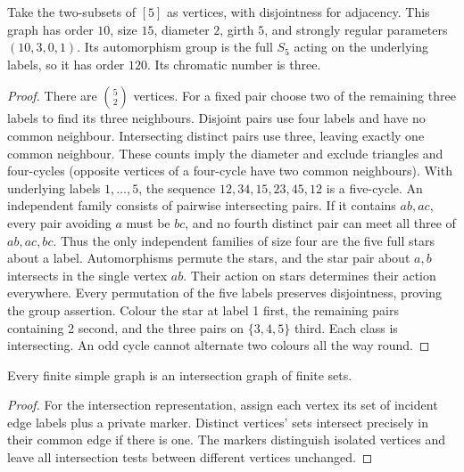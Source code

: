 \begin{theorem}\leavevmode\label{thm:petersen}
Take the two-subsets of $[5]$ as vertices, with disjointness for adjacency.
This graph has order $10$, size $15$, diameter $2$, girth $5$, and strongly
regular parameters $(10,3,0,1)$. Its automorphism group is the full $S_5$
acting on the underlying labels, so it has order $120$. Its chromatic number
is three.
\end{theorem}
\begin{proof}
There are $\binom52$ vertices. For a fixed pair choose two of the remaining
three labels to find its three neighbours. Disjoint pairs use four labels
and have no common neighbour. Intersecting distinct pairs use three, leaving
exactly one common neighbour. These counts imply the diameter and exclude
triangles and four-cycles (opposite vertices of a four-cycle have two common
neighbours). With underlying labels $1,\ldots,5$, the sequence
$12,34,15,23,45,12$ is a five-cycle. An independent family consists of
pairwise intersecting pairs. If it contains $ab,ac$, every pair avoiding
$a$ must be $bc$, and no fourth distinct pair can meet all three of
$ab,ac,bc$. Thus the only independent families of size four are the five
full stars about a label. Automorphisms permute the stars, and the star
pair about $a,b$ intersects in the single vertex $ab$. Their action on
stars determines their action everywhere. Every permutation of the five
labels preserves disjointness, proving the group assertion. Colour the star
at label 1 first, the remaining pairs containing 2 second, and the three
pairs on $\{3,4,5\}$ third. Each class is intersecting. An odd cycle cannot
alternate two colours all the way round.
\end{proof}

\begin{proposition}\leavevmode\label{idx:operations-intersection-representation}
Every finite simple graph is an intersection graph of finite sets.
\end{proposition}
\begin{proof}
For the intersection representation, assign each vertex its set of incident
edge labels plus a private marker. Distinct vertices' sets intersect precisely
in their common edge if there is one. The markers distinguish isolated
vertices and leave all intersection tests between different vertices unchanged.
\end{proof}


